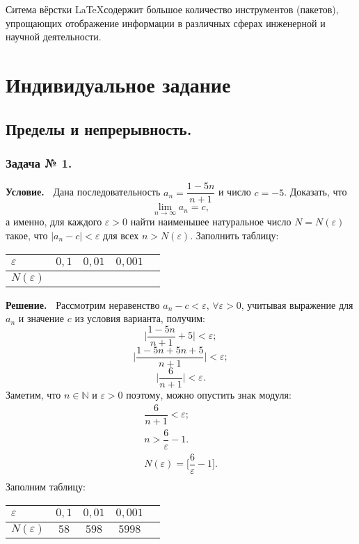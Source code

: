\documentclass[12pt]{article}
\newcommand{\eps}{\varepsilon}
\begin{document}
Ситема вёрстки \LaTeX содержит большое количество инструментов (пакетов), упрощающих отображение информации в различных 
сферах инженерной и научной деятельности. 

\newpage
\section{Индивидуальное задание}
\subsection{Пределы и непрерывность.}
\subsubsection*{\center Задача № 1.}
{\bf Условие.~}
Дана последовательность $a_{n}=\dfrac{1-5n}{n+1}$ и число $c=-5$.
Доказать, что $$\lim\limits_{n\rightarrow\infty}a_n=c,$$
а именно, для каждого $\eps>0$ найти наименьшее натуральное число $N{=}N(\eps)$ такое, что $|a_{n}-c|<\eps$ для всех $n>N(\eps)$.
Заполнить таблицу:
\begin{center}
\begin{tabular}{ | p{25pt} | c | c | c | c |}
\hline
$\varepsilon$& $0{,}1$ & $0{,}01$ & $0{,}001$ \\
\hline
$N(\varepsilon)$ &   &   &\\
\hline
\end{tabular}    
\end{center}
{\bf Решение.~}
Рассмотрим неравенство $a_n-c<\eps,\,\forall\eps>0$, учитывая выражение для $a_n$ и значение $c$ из условия варианта,
получим:
$$
\biggl|\frac{1-5n}{n+1}+5\biggr| < \eps ;
$$
$$
\biggl|\frac{1-5n+5n+5}{n+1}\biggr| < \eps ;
$$
$$
\biggl|\frac{6}{n+1}\biggr| < \eps .
$$
Заметим, что $n\in\mathbb{N}$ и $\eps >0$ поэтому, можно опустить знак модуля:
$$
\begin{array}{c}
\dfrac{6}{n+1} < \eps ;                         \\[8pt]
n > \dfrac{6}{\eps} - 1 .                       \\[8pt]
N(\eps) = \Biggl[\dfrac{6}{\eps} - 1\Biggr].    \\[8pt]
\end{array}
$$
\center Заполним таблицу:
\begin{center}
\begin{tabular}{ | p{25pt} | c | c | c | c |}
\hline
$\varepsilon$& $0{,}1$ & $0{,}01$ & $0{,}001$ \\
\hline
$N(\varepsilon)$& $58$ & $598$ & $5998$\\
\hline
\end{tabular}
\end{center} 
\end{document}
